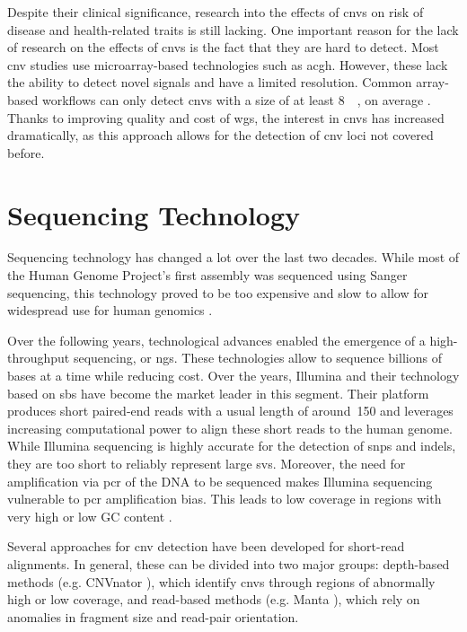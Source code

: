 \documentclass[twoside=false]{scrbook}
\begin{document}
Despite their clinical significance, research into the effects of \glspl{cnv} on risk of disease and health-related traits is still lacking.
One important reason for the lack of research on the effects of \glspl{cnv} is the fact that they are hard to detect.
Most \gls{cnv} studies use microarray-based technologies such as \gls{acgh}.
However, these lack the ability to detect novel signals and have a limited resolution.
Common array-based workflows can only detect \glspl{cnv} with a size of at least \qty{8}{\kilo\base}, on average \cite{Quenez2020}.
Thanks to improving quality and cost of \gls{wgs}, the interest in \glspl{cnv} has increased dramatically, as this approach allows for the detection of \gls{cnv} loci not covered before.

\section{Sequencing Technology}
Sequencing technology has changed a lot over the last two decades.
While most of the Human Genome Project's first assembly was sequenced using Sanger sequencing, this technology proved to be too expensive and slow to allow for widespread use for human genomics \cite{Lander2001}.

Over the following years, technological advances enabled the emergence of a high-throughput sequencing, or \gls{ngs}.
These technologies allow to sequence billions of bases at a time while reducing cost.
Over the years, Illumina and their technology based on \gls{sbs} have become the market leader in this segment.
Their platform produces short paired-end reads with a usual length of around \qty{150}{\base} and leverages increasing computational power to align these short reads to the human genome.
While Illumina sequencing is highly accurate for the detection of \glspl{snp} and \glspl{indel}, they are too short to reliably represent large \glspl{sv}.
Moreover, the need for amplification via \gls{pcr} of the DNA to be sequenced makes Illumina sequencing vulnerable to \gls{pcr} amplification bias.
This leads to low coverage in regions with very high or low GC content \cite{Aird2011}.

Several approaches for \gls{cnv} detection have been developed for short-read alignments.
In general, these can be divided into two major groups: depth-based methods (e.g. \textsf{CNVnator} \cite{Abyzov2011b}), which identify \glspl{cnv} through regions of abnormally high or low coverage, and read-based methods (e.g. \textsf{Manta} \cite{Chen2016a}), which rely on anomalies in fragment size and read-pair orientation.
\end{document}
